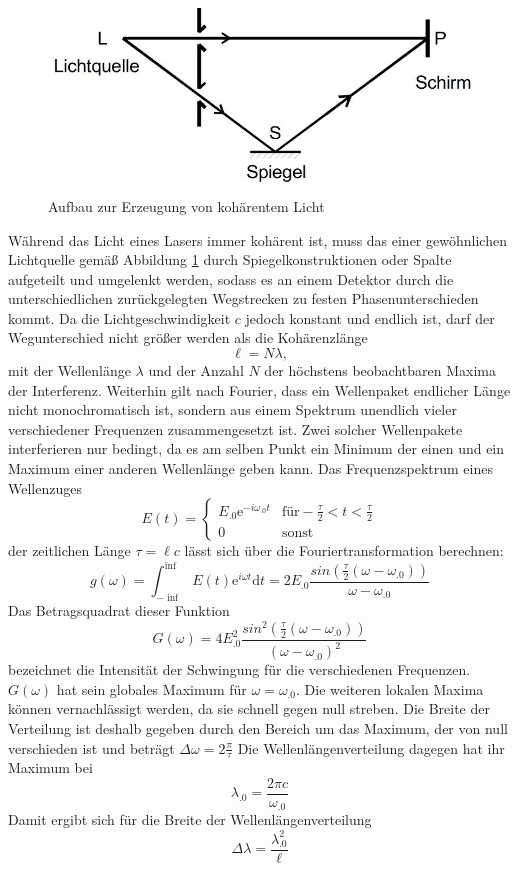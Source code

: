 \begin{figure}
\centering
\includegraphics[scale=0.5]{content/images/kohaerenz.jpg}
\caption{Aufbau zur Erzeugung von kohärentem Licht\cite{V401}}
\label{fig:Kohärenz}
\end{figure}
Während das Licht eines Lasers immer kohärent ist, muss das einer gewöhnlichen Lichtquelle gemäß Abbildung \ref{fig:Kohärenz} durch Spiegelkonstruktionen oder Spalte aufgeteilt und umgelenkt werden, sodass es an einem Detektor durch die unterschiedlichen zurückgelegten Wegstrecken zu festen Phasenunterschieden kommt.
Da die Lichtgeschwindigkeit $c$ jedoch konstant und endlich ist, darf der Wegunterschied nicht größer werden als die Kohärenzlänge 
\[
\ell = N\lambda,
\]
mit der Wellenlänge $\lambda$ und der Anzahl $N$ der höchstens beobachtbaren Maxima der Interferenz.
Weiterhin gilt nach Fourier, dass ein Wellenpaket endlicher Länge nicht monochromatisch ist, sondern aus einem Spektrum unendlich vieler verschiedener Frequenzen zusammengesetzt ist. Zwei solcher Wellenpakete interferieren nur bedingt, da es am selben Punkt ein Minimum der einen und ein Maximum einer anderen Wellenlänge geben kann.\newline
Das Frequenzspektrum eines Wellenzuges 
\[
E(t)=\begin{cases}
E_.0\mathrm{e}^{-i\omega_.0t} & \text{für} -\frac{\tau}{2}<t<\frac{\tau}{2}\\
0 & \text{sonst}
\end{cases}
\]
der zeitlichen Länge $\tau=\ell c$ lässt sich über die Fouriertransformation berechnen:
\begin{equation*}
g(\omega)=\int_{-\inf}^{\inf}E(t)\mathrm{e}^{i\omega t}\mathrm{d}t=2E_.0\frac{sin(\frac{\tau}{2}(\omega-\omega_.0))}{\omega-\omega_.0}
\end{equation*}
Das Betragsquadrat dieser Funktion
\begin{equation*}
G(\omega)=4E^2_.0\frac{sin^2(\frac{\tau}{2}(\omega-\omega_.0))}{(\omega-\omega_.0)^2}
\end{equation*}
bezeichnet die Intensität der Schwingung für die verschiedenen Frequenzen.
$G(\omega)$ hat sein globales Maximum für $\omega =\omega_.0$. Die weiteren lokalen Maxima können vernachlässigt werden, da sie schnell gegen null streben.
Die Breite der Verteilung ist deshalb gegeben durch den Bereich um das Maximum, der von null verschieden ist und beträgt
$\Delta\omega=2\frac{\pi}{\tau}$
Die Wellenlängenverteilung dagegen hat ihr Maximum bei 
\[
\lambda_.0=\frac{2\pi c}{\omega_.0}
\]
Damit ergibt sich für die Breite der Wellenlängenverteilung
\begin{equation}
\Delta\lambda=\frac{\lambda^2_.0}{\ell}\label{eq:dl}
\end{equation}
